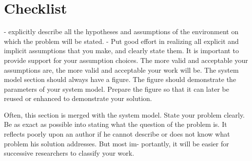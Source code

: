 \section{Checklist}
- explicitly describe all the hypotheses and assumptions of the environment on which the problem will be stated.
- Put good effort in realizing all explicit and implicit assumptions that you make, and clearly state them.
It is important to provide support for
your assumption choices. The more valid and acceptable
your assumptions are, the more valid and acceptable your
work will be.
The system model section should always have a figure.
The figure should demonstrate the parameters of your
system model. Prepare the figure so that it can later be
reused or enhanced to demonstrate your solution.

Often, this section is merged with the system model.
State your problem clearly. Be as exact as possible into
stating what the question of the problem is. It reflects
poorly upon an author if he cannot describe or does not
know what problem his solution addresses. But most im-
portantly, it will be easier for successive researchers to
classify your work.
